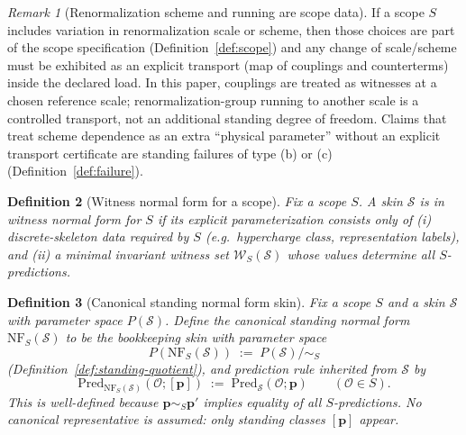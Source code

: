 \documentclass[11pt]{article}
\newtheorem{definition}{Definition}[section]
\theoremstyle{remark}
\newtheorem{remark}[definition]{Remark}
\newcommand{\Skin}{\mathcal{S}}
\newcommand{\Wit}{\mathcal{W}}
\begin{document}
\begin{remark}[Renormalization scheme and running are scope data]\label{rem:rg-scope}
If a scope $S$ includes variation in renormalization scale or scheme, then those choices are part of the scope
specification (Definition~\ref{def:scope}) and any change of scale/scheme must be exhibited as an explicit transport
(map of couplings and counterterms) inside the declared load.
In this paper, couplings are treated as witnesses at a chosen reference scale; renormalization-group running to
another scale is a controlled transport, not an additional standing degree of freedom.
Claims that treat scheme dependence as an extra ``physical parameter'' without an explicit transport certificate
are standing failures of type (b) or (c) (Definition~\ref{def:failure}).
\end{remark}


\begin{definition}[Witness normal form for a scope]\label{def:witness-normal-form}
Fix a scope $S$.
A skin $\Skin$ is in \emph{witness normal form for $S$} if its explicit parameterization consists only of
(i) discrete-skeleton data required by $S$ (e.g.\ hypercharge class, representation labels), and
(ii) a minimal invariant witness set $\Wit_S(\Skin)$ whose values determine all $S$-predictions.
\end{definition}

\begin{definition}[Canonical standing normal form skin]\label{def:NF-skin}
Fix a scope $S$ and a skin $\Skin$ with parameter space $P(\Skin)$.
Define the \emph{canonical standing normal form} $\mathrm{NF}_S(\Skin)$ to be the bookkeeping skin with
parameter space
\[
P(\mathrm{NF}_S(\Skin))\;:=\;P(\Skin)/\!\sim_S
\]
(Definition~\ref{def:standing-quotient}), and prediction rule inherited from $\Skin$ by
\begin{equation}\label{eq:NF-pred}
\mathrm{Pred}_{\mathrm{NF}_S(\Skin)}(\mathcal{O};[\mathbf{p}])\;:=\;\mathrm{Pred}_{\Skin}(\mathcal{O};\mathbf{p})
\qquad (\mathcal{O}\in S).
\end{equation}
This is well-defined because $\mathbf{p}\sim_S\mathbf{p}'$ implies equality of all $S$-predictions.
No canonical representative is assumed: only standing classes $[\mathbf{p}]$ appear.
\end{definition}
\end{document}
